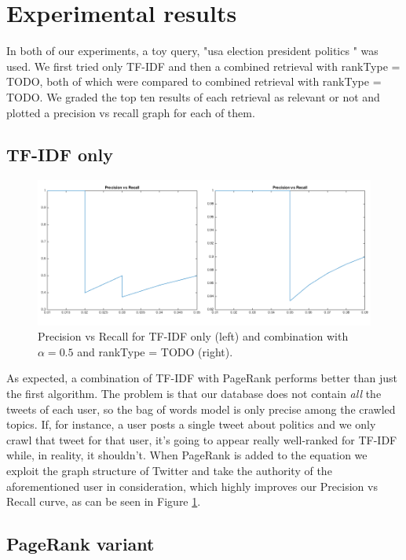 \section{Experimental results}

In both of our experiments, a toy query, "usa election president politics " was used. We first tried 
only TF-IDF and then a combined retrieval with rankType = TODO, both of which were compared to combined 
retrieval with rankType = TODO. We graded the top ten results of each retrieval as relevant or not and 
plotted a precision vs recall graph for each of them.

\subsection{TF-IDF only}

\begin{figure}[H]
\centering
\includegraphics[width=5.5in,natwidth=534,natheight=345]{images/exptfidf.png}
\caption{Precision vs Recall for TF-IDF only (left) and combination with $\alpha = 0.5$ and rankType = TODO (right).}
\label{fig:exptfidf}
\end{figure}

As expected, a combination of TF-IDF with PageRank performs better than just the first algorithm.
The problem is that our database does not contain \emph{all} the tweets of each user, so the bag
of words model is only precise among the crawled topics. If, for instance, a user posts a single tweet
about politics and we only crawl that tweet for that user, it's going to appear really well-ranked for
TF-IDF while, in reality, it shouldn't. When PageRank is added to the equation we exploit the
graph structure of Twitter and take the authority of the aforementioned user in consideration, which
highly improves our Precision vs Recall curve, as can be seen in Figure \ref{fig:exptfidf}.

\subsection{PageRank variant}


